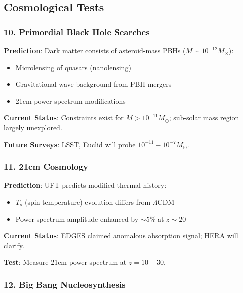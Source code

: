 \subsection{Cosmological Tests}

\subsubsection{10. Primordial Black Hole Searches}

\begin{test}
\textbf{Prediction}: Dark matter consists of asteroid-mass PBHs ($M \sim 10^{-12} M_\odot$):
\begin{itemize}
    \item Microlensing of quasars (nanolensing)
    \item Gravitational wave background from PBH mergers
    \item 21cm power spectrum modifications
\end{itemize}

\textbf{Current Status}: Constraints exist for $M > 10^{-11} M_\odot$; sub-solar mass region largely unexplored.

\textbf{Future Surveys}: LSST, Euclid will probe $10^{-11} - 10^{-7} M_\odot$.
\end{test}

\subsubsection{11. 21cm Cosmology}

\begin{test}
\textbf{Prediction}: UFT predicts modified thermal history:
\begin{itemize}
    \item $T_s$ (spin temperature) evolution differs from $\Lambda$CDM
    \item Power spectrum amplitude enhanced by $\sim 5\%$ at $z \sim 20$
\end{itemize}

\textbf{Current Status}: EDGES claimed anomalous absorption signal; HERA will clarify.

\textbf{Test}: Measure 21cm power spectrum at $z = 10-30$.
\end{test}

\subsubsection{12. Big Bang Nucleosynthesis}

